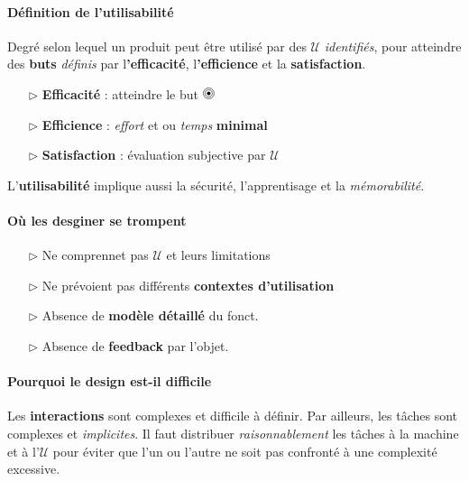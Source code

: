 \documentclass{report}
\newcommand{\target}{%
  \begin{tikzpicture}[scale=0.5]
    \fill[black] (0,0) circle (0.1);
    \draw (0,0) circle (0.2);
    \draw (0,0) circle (0.3);
  \end{tikzpicture}%
}
\begin{document}
\begin{multicols*}{3}
    \paragraph{Définition de l'utilisabilité}
    Degré selon lequel un produit peut être utilisé par des 
    $\mathcal{U}$ \textit{identifiés}, pour atteindre des 
    \textbf{buts} \textit{définis} par 
    l\textbf{'efficacité}, l\textbf{'efficience} et 
    la \textbf{satisfaction}.   
    \begin{itemize}
        \item [$\rhd $] \textbf{ Efficacité} : atteindre le but \;  $\target$
        \item [$\rhd $] \textbf{ Efficience} : \textit{effort} 
            et ou \textit{temps} \textbf{minimal} \;  
        \item [$\rhd $] \textbf{ Satisfaction} :  
            évaluation subjective par $\mathcal{U}$
    \end{itemize}

    \begin{note}{}{}
        L'\textbf{utilisabilité} implique aussi la sécurité, l'apprentisage 
        et la \textit{mémorabilité}.   
    \end{note}

    \paragraph{Où les desginer se trompent}  
    \begin{itemize}
      \item [$\rhd $] Ne comprennet pas $\mathcal{U}$ et leurs limitations
      \item [$\rhd $] Ne prévoient pas différents \textbf{contextes d'utilisation}  
      \item [$\rhd $] Absence de \textbf{modèle détaillé} du fonct.        
      \item [$\rhd $] Absence de \textbf{feedback} par l'objet.        
    \end{itemize}

    \paragraph{Pourquoi le design est-il difficile}
    Les \textbf{interactions} sont complexes et difficile à définir. Par ailleurs, les tâches 
    sont complexes et \textit{implicites}. Il faut distribuer \textit{raisonnablement}
    les tâches à la machine et à l'$\mathcal{U}$ pour éviter que l'un ou l'autre 
    ne soit pas confronté à une complexité excessive. 


\end{multicols*}
\end{document}
